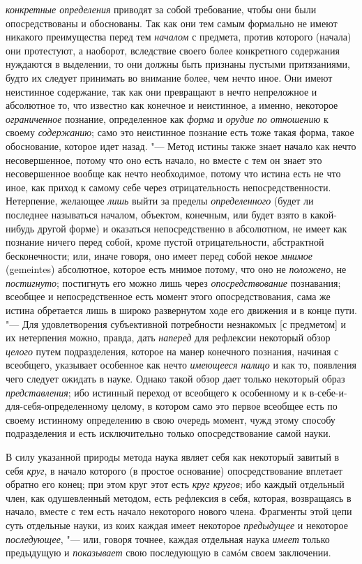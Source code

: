 {\em конкретные определения}
приводят за собой требование, чтобы они были опосредствованы
и обоснованы. Так как они тем самым формально не имеют никакого
преимущества перед тем {\em началом}
с предмета, против которого (начала) они протестуют, а
наоборот, вследствие своего более конкретного содержания нуждаются в
выделении, то они должны быть признаны пустыми притязаниями, будто их
следует принимать во внимание более, чем нечто иное. Они имеют
неистинное содержание, так как они превращают в нечто непреложное и
абсолютное то, что известно как конечное и неистинное, а именно, некоторое
{\em ограниченное} познание, определенное как {\em форма} и {\em орудие}
{\em по отношению} к своему {\em содержанию};
само это неистинное познание есть тоже такая форма, такое
обоснование, которое идет назад. "--- Метод истины также знает
начало как нечто несовершенное, потому что оно есть начало, но вместе с тем
он знает это несовершенное вообще как нечто необходимое,
потому что истина есть не что иное, как приход к самому себе через
отрицательность непосредственности. Нетерпение, желающее
{\em лишь} выйти за пределы {\em определенного}
(будет ли последнее называться началом, объектом, конечным,
или будет взято в какой-нибудь другой форме) и оказаться непосредственно в
абсолютном, не имеет как познание ничего перед собой, кроме пустой
отрицательности, абстрактной бесконечности; или, иначе говоря, оно имеет
перед собой некое {\em мнимое} (gemeintes) абсолютное, которое есть мнимое
потому, что оно не {\em положено}, не {\em постигнуто};
постигнуть его можно лишь через {\em опосредствование}
познавания; всеобщее и непосредственное есть момент этого
опосредствования, сама же истина обретается лишь в широко развернутом ходе
его движения и в конце пути. "--- Для удовлетворения
субъективной потребности незнакомых [с предметом] и их нетерпения можно,
правда, дать {\em наперед} для рефлексии некоторый обзор {\em целого} путем
подразделения, которое на манер конечного познания, начиная с всеобщего,
указывает особенное как нечто {\em имеющееся налицо} и
как то, появления чего следует ожидать в науке. Однако такой обзор дает
только некоторый образ {\em представления}; ибо
истинный переход от всеобщего к особенному и к
в-себе-и-для-себя-определенному целому, в котором само это первое всеобщее
есть по своему истинному определению в свою очередь момент, чужд этому
способу подразделения и есть исключительно только опосредствование самой науки.

В силу указанной природы метода наука являет себя как некоторый завитый в себя
{\em круг}, в начало которого (в простое основание) опосредствование вплетает
обратно его конец; при этом круг этот есть {\em круг кругов}; ибо каждый
отдельный член, как одушевленный методом, есть рефлексия в себя, которая,
возвращаясь в начало, вместе с тем есть начало некоторого нового члена.
Фрагменты этой цепи суть отдельные науки, из коих каждая имеет некоторое
{\em предыдущее} и некоторое {\em последующее}, "--- или, говоря точнее,
каждая отдельная наука {\em имеет} только предыдущую и {\em показывает}
свою последующую в самóм своем заключении.

